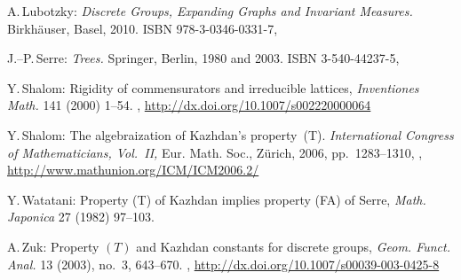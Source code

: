 \begin{references}{99}
A.\,Lubotzky:
\emph{Discrete Groups, Expanding Graphs and Invariant Measures.}
Birkhäuser, Basel, 2010. 
ISBN 978-3-0346-0331-7,


J.--P.\,Serre:
\emph{Trees.}
Springer, Berlin, 1980 and 2003. 
ISBN 3-540-44237-5,

Y.\,Shalom:
Rigidity of commensurators and irreducible lattices,
\emph{Inventiones Math.} 141 (2000) 1--54.
,
\maynewline
\url{http://dx.doi.org/10.1007/s002220000064}

Y.\,Shalom:
The algebraization of Kazhdan's property~(T).
\emph{International Congress of Mathematicians, Vol.~II,}
Eur. Math. Soc., Z\"urich, 2006, pp.~1283--1310, 
,
\maynewline
\url{http://www.mathunion.org/ICM/ICM2006.2/}

 
Y.\,Watatani:
Property (T) of Kazhdan implies property (FA) of Serre,
\emph{Math. Japonica} 27 (1982) 97--103.


A.\,Zuk:
Property $(T)$ and Kazhdan constants for discrete groups,
\emph{Geom. Funct. Anal.} 13 (2003), no.~3, 643--670.
,
\maynewline
\url{http://dx.doi.org/10.1007/s00039-003-0425-8}

\end{references}




